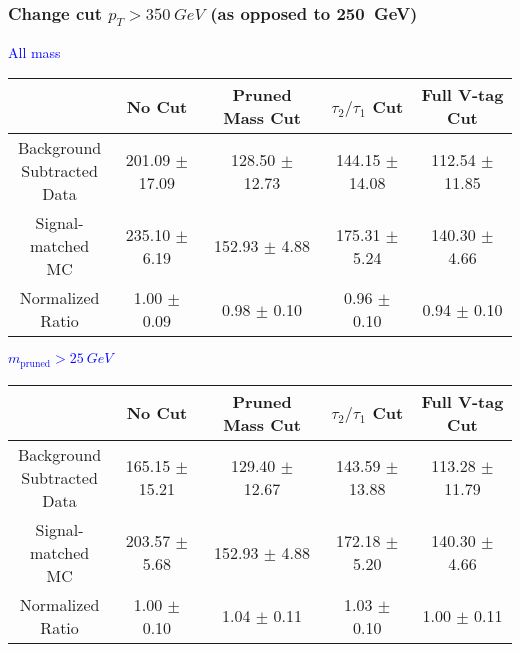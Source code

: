 \documentclass{beamer}
\newcommand{\backupend}{
  \addtocounter{framenumbervorappendix}{-\value{framenumber}}
  \addtocounter{framenumber}{\value{framenumbervorappendix}} 
}
\begin{document}
\begin{frame}
  \frametitle{Change cut $p_T > \SI{350}{GeV}$ (as opposed to \SI{250}{GeV})}
  \begin{adjustwidth}{-1.5em}{-1.5em}
    \centering
    \vspace{6pt}
    \textcolor{blue}{All mass}
    \vspace{6pt}

    {\scriptsize
      \begin{tabular}{c | c | c | c | c}
        \hline
        & No Cut & Pruned Mass Cut & $\tau_2/\tau_1$ Cut & Full V-tag Cut \\
        \hline
        \makecell{Background \\ Subtracted \\ Data} & 201.09 $\pm$ 17.09 & 128.50 $\pm$ 12.73 & 144.15 $\pm$ 14.08 & 112.54 $\pm$ 11.85 \\
        \makecell{Signal-\\ matched MC} & 235.10 $\pm$ 6.19 & 152.93 $\pm$ 4.88 & 175.31 $\pm$ 5.24 & 140.30 $\pm$ 4.66 \\
        \hline
        \makecell{Normalized \\ Ratio} & 1.00 $\pm$ 0.09 & 0.98 $\pm$ 0.10 & 0.96 $\pm$ 0.10 & 0.94 $\pm$ 0.10 \\
        \hline
      \end{tabular}
    }

    \vspace{6pt}
    \textcolor{blue}{$m_\text{pruned} > \SI{25}{GeV}$}
    \vspace{6pt}

    {\scriptsize
      \begin{tabular}{c | c | c | c | c}
        \hline
        & No Cut & Pruned Mass Cut & $\tau_2/\tau_1$ Cut & Full V-tag Cut \\
        \hline
        \makecell{Background \\ Subtracted \\ Data} & 165.15 $\pm$ 15.21 & 129.40 $\pm$ 12.67 & 143.59 $\pm$ 13.88 & 113.28 $\pm$ 11.79 \\
        \makecell{Signal-\\ matched MC} & 203.57 $\pm$ 5.68 & 152.93 $\pm$ 4.88 & 172.18 $\pm$ 5.20 & 140.30 $\pm$ 4.66 \\
        \hline
        \makecell{Normalized \\ Ratio} & 1.00 $\pm$ 0.10 & 1.04 $\pm$ 0.11 & 1.03 $\pm$ 0.10 & 1.00 $\pm$ 0.11 \\
        \hline
      \end{tabular}
    }
  \end{adjustwidth}
\end{frame}



\backupend
\end{document}
